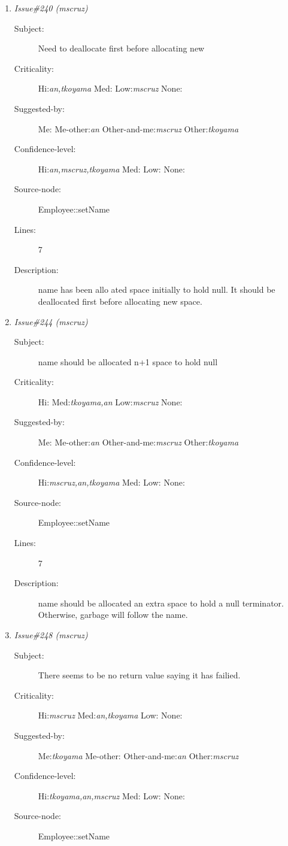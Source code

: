 \begin{enumerate}
\begin{description}
\item [Lines:] 4-5

\item [Description:] newName should be first checked to see if a
name was actually passed in.
\end{description}
\item {\it Issue\#240 (mscruz)}
\begin{description}
\item [Subject:] Need to deallocate first before allocating new
\item [Criticality:] Hi:{\it an,tkoyama} Med:{\it } Low:{\it mscruz} None:{\it }
\item [Suggested-by:] Me:{\it } Me-other:{\it an} Other-and-me:{\it mscruz} Other:{\it tkoyama}
\item [Confidence-level:] Hi:{\it an,mscruz,tkoyama} Med:{\it } Low:{\it } None:{\it }
\item [Source-node:] Employee::setName

\item [Lines:] 7

\item [Description:] name has been allo
ated space initially to hold null.  It should be deallocated first before
allocating new space.
\end{description}
\item {\it Issue\#244 (mscruz)}
\begin{description}
\item [Subject:] name should be allocated n+1 space to hold null
\item [Criticality:] Hi:{\it } Med:{\it tkoyama,an} Low:{\it mscruz} None:{\it }
\item [Suggested-by:] Me:{\it } Me-other:{\it an} Other-and-me:{\it mscruz} Other:{\it tkoyama}
\item [Confidence-level:] Hi:{\it mscruz,an,tkoyama} Med:{\it } Low:{\it } None:{\it }
\item [Source-node:] Employee::setName

\item [Lines:] 7

\item [Description:] name should be allocated an extra space to
hold a null terminator.  Otherwise, garbage will follow the name.
\end{description}
\item {\it Issue\#248 (mscruz)}
\begin{description}
\item [Subject:] There seems to be no return value saying it has failied.
\item [Criticality:] Hi:{\it mscruz} Med:{\it an,tkoyama} Low:{\it } None:{\it }
\item [Suggested-by:] Me:{\it tkoyama} Me-other:{\it } Other-and-me:{\it an} Other:{\it mscruz}
\item [Confidence-level:] Hi:{\it tkoyama,an,mscruz} Med:{\it } Low:{\it } None:{\it }
\item [Source-node:] Employee::setName


\end{description}
\end{enumerate}
